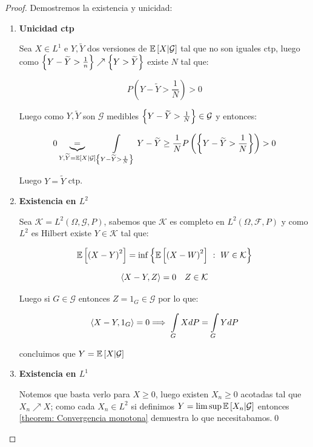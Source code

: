 \begin{proof}
	Demostremos la existencia y unicidad:
	
	\begin{enumerate}
		\item {\textbf{Unicidad ctp}}
		
		Sea $X \in L^1$ e $Y,\widetilde{Y}$ dos versiones de $\mathbb{E} \left[X \vert \mathcal{G}\right]$ tal que no son iguales ctp, luego como $\left\lbrace Y - \widetilde{Y} > \frac{1}{n}\right\rbrace \nearrow \left\lbrace Y > \widetilde{Y}\right\rbrace$ existe $N$ tal que:
		
		\begin{equation*}
			P\left(Y - \widetilde{Y} > \frac{1}{N}\right) > 0
		\end{equation*}
		
		Luego como $Y, \widetilde{Y}$ son $\mathcal{G}$ medibles $\left\lbrace Y - \widetilde{Y} > \frac{1}{N}\right\rbrace \in \mathcal{G}$ y entonces:
		
		\begin{equation*}
			0 \underbrace{=}_{Y,\widetilde{Y} = \mathbb{E} \left[X \vert \mathcal{G}\right]} \int\limits_{\left\lbrace Y - \widetilde{Y} > \frac{1}{N}\right\rbrace} {Y - \widetilde{Y}} \geq \frac{1}{N} P \left(\left\lbrace Y - \widetilde{Y} > \frac{1}{N}\right\rbrace\right) > 0
		\end{equation*}
		
		Luego $Y = \widetilde{Y}$ ctp.
		
		\item {\textbf{Existencia en $L^2$}}
		
		Sea $\mathcal{K} = L^2(\Omega, \mathcal{G}, P)$, sabemos que $\mathcal{K} $ es completo en $L^2(\Omega, \mathcal{F}, P)$ y como $L^2$ es Hilbert existe $Y \in \mathcal{K} $ tal que:
		
		\begin{equation*}
			\mathbb{E} \left[\left(X - Y \right)^2\right] = \inf \left\lbrace\mathbb{E} \left[\left(X - W \right)^2\right] ~:~ W \in \mathcal{K}\right\rbrace
		\end{equation*}
		
		\begin{equation*}
			\left\langle X-Y, Z\right\rangle = 0 \quad Z \in \mathcal{K}
		\end{equation*}
		
		Luego si $G \in \mathcal{G}$ entonces $Z = 1_{G} \in \mathcal{G}$ por lo que:
		
		\begin{equation*}
			\ip{X-Y, 1_G} = 0 \Longrightarrow \ \int\limits_{G} {XdP} = \int\limits_{G}{Y dP}
		\end{equation*}
		
		concluimos que $Y = \mathbb{E} \left[X \vert \mathcal{G}\right]$
		
		\item {\textbf{Existencia en $L^1$}}		
		
		Notemos que basta verlo para $X \geq 0$, luego existen $X_n \geq 0$ acotadas tal que $X_n \nearrow X$; como cada $X_n \in L^2$ si definimos $Y = \limsup \mathbb{E} \left[X_n \vert \mathcal{G}\right]$ entonces \ref{theorem: Convergencia monotona} demuestra lo que necesitabamos.\qed
		
	\end{enumerate}
	
\end{proof}

